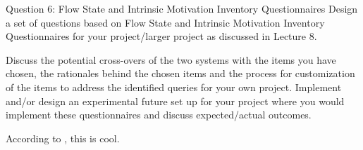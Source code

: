 \begin{fancyquotes}
Question 6: Flow State and Intrinsic Motivation Inventory Questionnaires
Design a set of questions based on Flow State and Intrinsic Motivation Inventory Questionnaires for your project/larger project as discussed in Lecture 8.

Discuss the potential cross-overs of the two systems with the items you have chosen, the rationales behind the chosen items and the process for customization of the items to address the identified queries for your own project. Implement and/or design an experimental future set up for your project where you would implement these questionnaires and discuss expected/actual outcomes. 

\end{fancyquotes}

According to \cite{patternsInGameDesign}, this is cool.